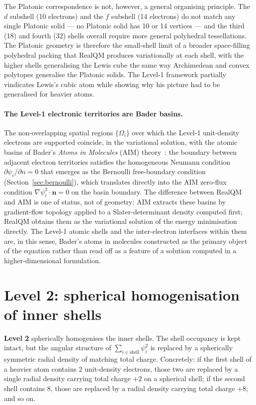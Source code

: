 The Platonic correspondence is not, however, a general organising principle. The $d$ subshell (10 electrons) and the $f$ subshell (14 electrons) do not match any single Platonic solid --- no Platonic solid has 10 or 14 vertices --- and the third (18) and fourth (32) shells overall require more general polyhedral tessellations. The Platonic geometry is therefore the small-shell limit of a broader space-filling polyhedral packing that RealQM produces variationally at each shell, with the higher shells generalising the Lewis cube the same way Archimedean and convex polytopes generalise the Platonic solids. The Level-1 framework partially vindicates Lewis's cubic atom while showing why his picture had to be generalised for heavier atoms.

\paragraph{The Level-1 electronic territories are Bader basins.}
The non-overlapping spatial regions $\{\Omega_i\}$ over which the Level-1 unit-density electrons are supported coincide, in the variational solution, with the atomic basins of Bader's \emph{Atoms in Molecules} (AIM) theory~\cite{Bader90}: the boundary between adjacent electron territories satisfies the homogeneous Neumann condition $\partial \psi_i / \partial n = 0$ that emerges as the Bernoulli free-boundary condition (Section~\ref{sec:bernoulli}), which translates directly into the AIM zero-flux condition $\nabla \psi_i^2 \cdot \mathbf{n} = 0$ on the basin boundary. The difference between RealQM and AIM is one of status, not of geometry: AIM extracts these basins by gradient-flow topology applied to a Slater-determinant density computed first; RealQM obtains them as the variational solution of the energy minimisation directly. The Level-1 atomic shells and the inter-electron interfaces within them are, in this sense, Bader's atoms in molecules constructed as the primary object of the equation rather than read off as a feature of a solution computed in a higher-dimensional formulation.

\section{Level 2: spherical homogenisation of inner shells}\label{sec:level2}

\textbf{Level 2} spherically homogenises the inner shells. The shell occupancy is kept intact, but the angular structure of $\sum_{i \in \text{shell}} \psi_i^2$ is replaced by a spherically symmetric radial density of matching total charge. Concretely: if the first shell of a heavier atom contains 2 unit-density electrons, those two are replaced by a single radial density carrying total charge $+2$ on a spherical shell; if the second shell contains 8, those are replaced by a radial density carrying total charge $+8$; and so on.

